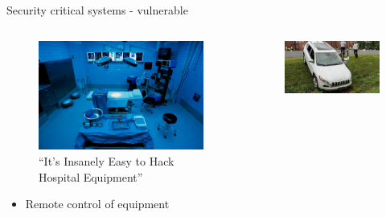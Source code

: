 \documentclass[xcolor={x11names}]{beamer}
\begin{document}
\begin{frame}{Security critical systems - vulnerable}
    \pause
    \begin{columns}
        \begin{column}{0.5\textwidth}
            \begin{figure}
                \centering
                \includegraphics[height=.3\textheight]{figures/hospital-hacking.jpg}
                \caption{``It's Insanely Easy to Hack Hospital Equipment'' \cite{zetter_its_2014}}
                \label{hack_hospital}
            \end{figure}
            \pause
            \begin{itemize}
                \item Remote control of equipment
            \end{itemize}
        \end{column}
        \pause
        \begin{column}{0.5\textwidth}
            \begin{figure}
                \centering
                \includegraphics[height=.3\textheight]{figures/jeep_offroad.jpg}

\end{figure}
\end{column}
\end{columns}
\end{frame}
\end{document}
